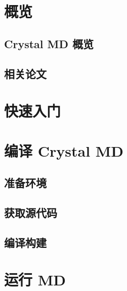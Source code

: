 
\chapter{概览}
\section{Crystal MD 概览}

\section{相关论文}


\chapter{快速入门}
\section{}


\chapter{编译 Crystal MD}
\section{准备环境}

\section{获取源代码}

\section{编译构建}


\chapter{运行 MD}
\section{}


\section{}


